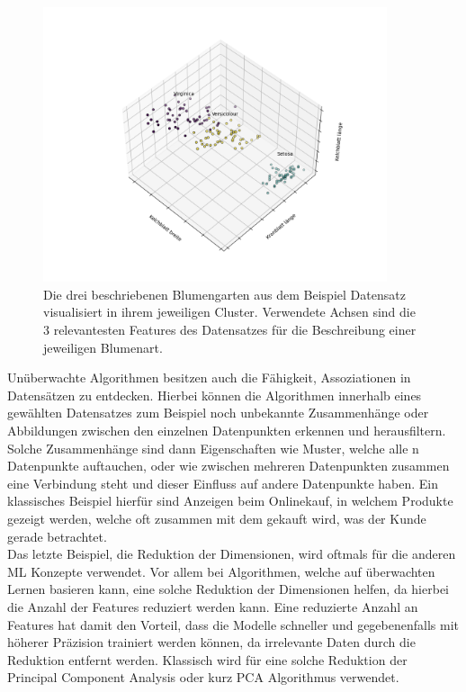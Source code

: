 \documentclass[]{iat}
\begin{document}
\begin{figure}[H]
    \includegraphics[width=0.9\textwidth]{graphics/iris_set_groundtruth.png}
    \centering
    \caption{Die drei beschriebenen Blumengarten aus dem Beispiel Datensatz visualisiert in ihrem jeweiligen Cluster. Verwendete Achsen sind die 3 relevantesten Features des Datensatzes für die Beschreibung einer jeweiligen Blumenart.}
    \label{abb:flower_example}
\end{figure}
Unüberwachte Algorithmen besitzen auch die Fähigkeit, Assoziationen in Datensätzen zu entdecken. Hierbei können die Algorithmen innerhalb eines gewählten Datensatzes zum Beispiel noch unbekannte Zusammenhänge oder Abbildungen zwischen den einzelnen Datenpunkten erkennen und herausfiltern. Solche Zusammenhänge sind dann Eigenschaften wie Muster, welche alle n Datenpunkte auftauchen, oder wie zwischen mehreren Datenpunkten zusammen eine Verbindung steht und dieser Einfluss auf andere Datenpunkte haben. Ein klassisches Beispiel hierfür sind Anzeigen beim Onlinekauf, in welchem Produkte gezeigt werden, welche oft zusammen mit dem gekauft wird, was der Kunde gerade betrachtet.\\
Das letzte Beispiel, die Reduktion der Dimensionen, wird oftmals für die anderen ML Konzepte verwendet. Vor allem bei Algorithmen, welche auf überwachten Lernen basieren kann, eine solche Reduktion der Dimensionen helfen, da hierbei die Anzahl der Features reduziert werden kann. Eine reduzierte Anzahl an Features hat damit den Vorteil, dass die Modelle schneller und gegebenenfalls mit höherer Präzision trainiert werden können, da irrelevante Daten durch die Reduktion entfernt werden. Klassisch wird für eine solche Reduktion der Principal Component Analysis oder kurz PCA Algorithmus verwendet.
\end{document}
